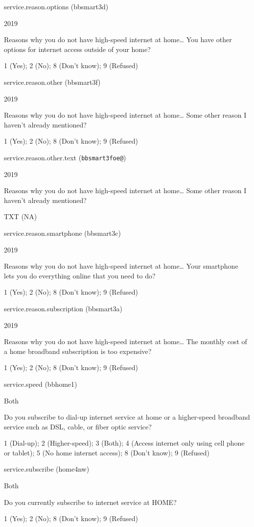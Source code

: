 \documentclass[]{book}
\begin{document}
service.reason.options (bbsmart3d)

2019

Reasons why you do not have high-speed internet at home\ldots{} You have
other options for internet access outside of your home?

1 (Yes); 2 (No); 8 (Don't know); 9 (Refused)

service.reason.other (bbsmart3f)

2019

Reasons why you do not have high-speed internet at home\ldots{} Some
other reason I haven't already mentioned?

1 (Yes); 2 (No); 8 (Don't know); 9 (Refused)

service.reason.other.text (\texttt{bbsmart3foe@})

2019

Reasons why you do not have high-speed internet at home\ldots{} Some
other reason I haven't already mentioned?

TXT (NA)

service.reason.smartphone (bbsmart3c)

2019

Reasons why you do not have high-speed internet at home\ldots{} Your
smartphone lets you do everything online that you need to do?

1 (Yes); 2 (No); 8 (Don't know); 9 (Refused)

service.reason.subscription (bbsmart3a)

2019

Reasons why you do not have high-speed internet at home\ldots{} The
monthly cost of a home broadband subscription is too expensive?

1 (Yes); 2 (No); 8 (Don't know); 9 (Refused)

service.speed (bbhome1)

Both

Do you subscribe to dial-up internet service at home or a higher-speed
broadband service such as DSL, cable, or fiber optic service?

1 (Dial-up); 2 (Higher-speed); 3 (Both); 4 (Access internet only using
cell phone or tablet); 5 (No home internet access); 8 (Don't know); 9
(Refused)

service.subscribe (home4nw)

Both

Do you currently subscribe to internet service at HOME?

1 (Yes); 2 (No); 8 (Don't know); 9 (Refused)
\end{document}
